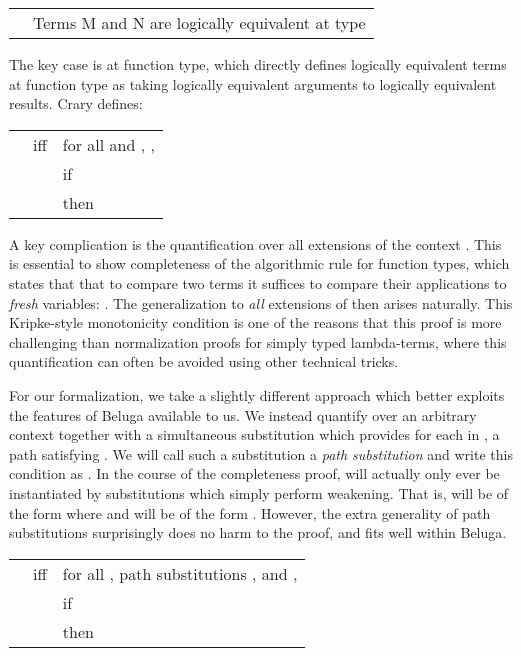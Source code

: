 \documentclass[copyright,creativecommons]{eptcs}
\newcommand{\dRed}[1]{{\color{dRed}#1}}
\newcommand{\emphFact}[1]{{\dRed{#1}}}
\begin{document}
\begin{center}
  \begin{tabular}{@{}l@{~~~}l@{}}
 & Terms M and N are logically equivalent at
type  \\
  \end{tabular}
\end{center}

The key case is at function type, which directly defines logically
equivalent terms at function type as taking logically equivalent arguments
to logically equivalent results. Crary defines:

\begin{center}
  \begin{tabular}{@{}l@{~~~}l@{~~~}l@{}}
 & iff & \emphFact{for all }
and , , \\
& & if \\
& & then 
  \end{tabular}
\end{center}

A key complication is the quantification over all extensions 
of the context . This is essential to show completeness of the
algorithmic rule for function types, which states that that to compare
two terms  it suffices to
compare their applications to \emph{fresh} variables: . The
generalization to \emph{all} extensions  of  then
arises naturally. This Kripke-style monotonicity condition
is one of the reasons that this proof is more challenging than normalization
proofs for simply typed lambda-terms, where this
quantification can often be avoided using other technical tricks.

For our formalization, we take a slightly different approach which 
better exploits the features of Beluga available to us. We
instead quantify over an arbitrary context  together with a
simultaneous substitution  which provides for each  in
, a path  satisfying . We will call such a substitution a \emph{path substitution} and write this
condition as . In the course of the completeness proof, 
will actually only ever be instantiated by substitutions which simply
perform weakening. That is,  will be of the form
 where  and  will be of the form
. However, the extra generality of path
substitutions surprisingly does no harm to the proof, and fits well within Beluga.

\begin{center}
  \begin{tabular}{@{}l@{~~~}l@{~~~}l@{}}
 & iff & \emphFact{for all
, path substitutions }, and ,  \\
& & if  \\
& & then \emphFact{}
  \end{tabular}
\end{center}
\end{document}
